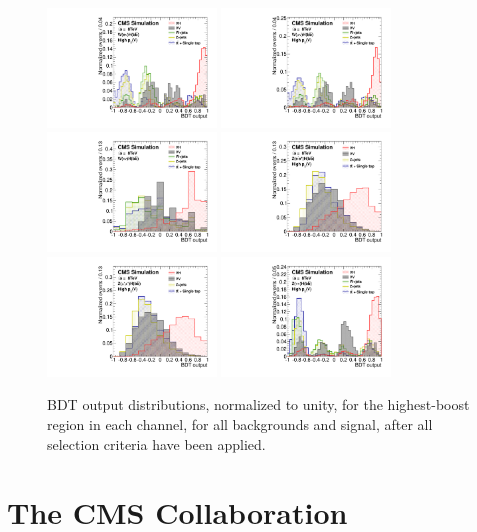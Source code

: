 \documentclass[12pt,twoside,a4paper,cmspaper,final,collab]{cms-tdr}
\begin{document}
\begin{figure}[htbp]
\centering
    \includegraphics[width=0.4\textwidth]{comparison_BDT_Wln_ch1_Wenu3_PostFit_s}
    \includegraphics[width=0.4\textwidth]{comparison_BDT_Wln_ch2_Wmunu3_PostFit_s}
    \includegraphics[width=0.4\textwidth]{comparison_BDT_Wtn_Wtn_PostFit_s}
    \includegraphics[width=0.4\textwidth]{comparison_BDT_Zll_ZeeHighPt_PostFit_s}
    \includegraphics[width=0.4\textwidth]{comparison_BDT_Zll_ZmmHighPt_PostFit_s}
    \includegraphics[width=0.4\textwidth]{comparison_BDT_Znn_HighPt_ZnunuHighPt_8TeV_PostFit_s}
    \caption{BDT output distributions, normalized to unity, for the highest-boost region in each
    channel, for all backgrounds and signal, after all selection
    criteria have been applied.}
    \label{fig:BDT_norm}
\end{figure}
\cleardoublepage \appendix\section{The CMS Collaboration \label{app:collab}}\begin{sloppypar}\end{sloppypar}
\end{document}
